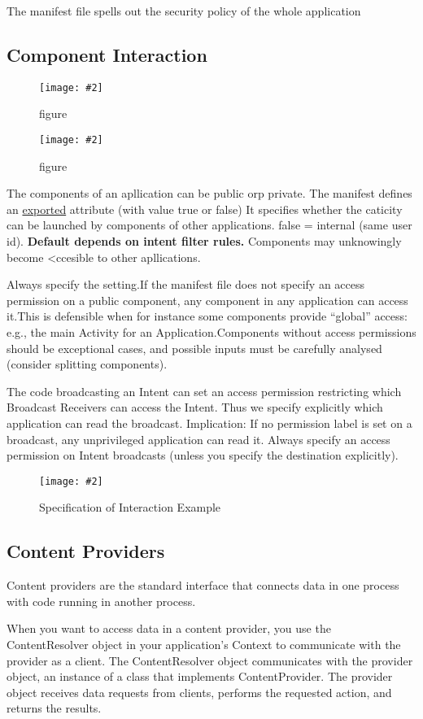 \documentclass[a4paper,10pt]{scrreprt}
\newcommand{\pic}[2][figure]{\begin{figure}[h]
 \centering
 \texttt{[image: \#2]}
 \caption{#1}
\end{figure}
}
\begin{document}
\begin{framed}
 The manifest file spells out the security policy of the whole application
\end{framed}

\subsection{Component Interaction}
\pic{compint.png}

\pic{amfest.png}

The components of an apllication can be public orp private. The manifest defines an \underline{exported}  attribute 
(with value true or false) It specifies whether the caticity can be launched by components of other applications. false 
= internal (same user id). \textbf{Default depends on intent filter rules.} Components may unknowingly become <ccesible 
to other apllications.
\begin{framed}
 Always specify the setting.If the manifest file does not specify an access permission on a public component,
any component in any application can access it.This is defensible when for instance some components provide “global”
access: e.g., the main Activity for an Application.Components without access permissions should be exceptional cases,
and possible inputs must be carefully analysed (consider splitting
components).
\end{framed}
\begin{framed}
 The code broadcasting an Intent can set an access permission restricting
which Broadcast Receivers can access the Intent.
Thus we specify explicitly which application can read the broadcast.
Implication: If no permission label is set on a broadcast, any unprivileged
application can read it.
Always specify an access permission on Intent broadcasts (unless you
specify the destination explicitly).
\end{framed}

\pic[Specification of Interaction Example]{speint.png}

\subsection{Content Providers}
Content providers are the standard interface that connects data in one process with code running in another process.

When you want to access data in a content provider, you use the ContentResolver object in your application's Context to 
communicate with the provider as a client. The ContentResolver object communicates with the provider object, an 
instance 
of a class that implements ContentProvider. The provider object receives data requests from clients, performs the 
requested action, and returns the results.
\end{document}

